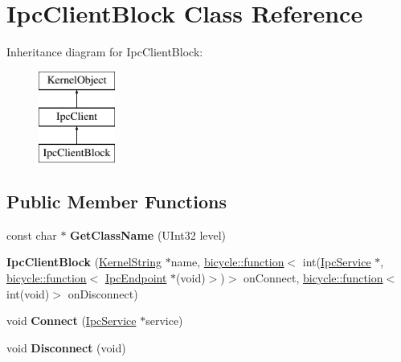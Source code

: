 \hypertarget{class_ipc_client_block}{}\section{Ipc\+Client\+Block Class Reference}
\label{class_ipc_client_block}
Inheritance diagram for Ipc\+Client\+Block\+:\begin{figure}[H]
\begin{center}
\leavevmode
\includegraphics[height=3.000000cm]{class_ipc_client_block}
\end{center}
\end{figure}
\subsection*{Public Member Functions}
\begin{DoxyCompactItemize}
\item 
\mbox{\label{class_ipc_client_block_afcc3f5d9dad84863d69b7404c608be26}} 
const char $\ast$ {\bfseries Get\+Class\+Name} (U\+Int32 level)
\item 
\mbox{\label{class_ipc_client_block_ae3a54781e31b952d271cfdb69d60054b}} 
{\bfseries Ipc\+Client\+Block} (\hyperlink{class_kernel_string}{Kernel\+String} $\ast$name, \hyperlink{classbicycle_1_1function}{bicycle\+::function}$<$ int(\hyperlink{class_ipc_service}{Ipc\+Service} $\ast$, \hyperlink{classbicycle_1_1function}{bicycle\+::function}$<$ \hyperlink{class_ipc_endpoint}{Ipc\+Endpoint} $\ast$(void)$>$)$>$ on\+Connect, \hyperlink{classbicycle_1_1function}{bicycle\+::function}$<$ int(void)$>$ on\+Disconnect)
\item 
\mbox{\label{class_ipc_client_block_afdaa4a4a37fa1576101c234492d0e777}} 
void {\bfseries Connect} (\hyperlink{class_ipc_service}{Ipc\+Service} $\ast$service)
\item 
\mbox{\label{class_ipc_client_block_a2c4c915e6b099fd7a7b3c4910900dc05}} 
void {\bfseries Disconnect} (void)
\end{DoxyCompactItemize}
